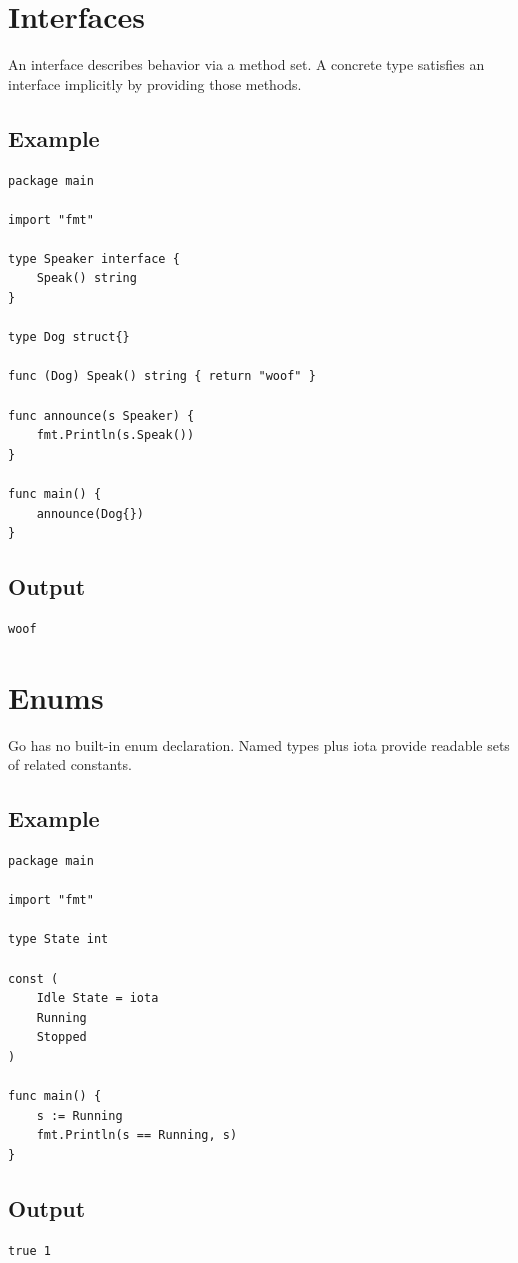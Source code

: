 \documentclass[10pt,oneside]{article}
\newcommand{\sectionline}{\par\vspace{4pt}{\color{rule}\hrule height .5pt}\vspace{7pt}\color{ink}\noindent}
\begin{document}
\section{Interfaces}
\sectionline
An interface describes behavior via a method set. A concrete type satisfies an interface implicitly by providing those methods.\par
\subsection*{Example}
\begin{lstlisting}[style=gocode]
package main

import "fmt"

type Speaker interface {
	Speak() string
}

type Dog struct{}

func (Dog) Speak() string { return "woof" }

func announce(s Speaker) {
	fmt.Println(s.Speak())
}

func main() {
	announce(Dog{})
}
\end{lstlisting}
\subsection*{Output}
\begin{lstlisting}[style=terminal]
woof
\end{lstlisting}
\clearpage
\section{Enums}
\sectionline
Go has no built-in enum declaration. Named types plus iota provide readable sets of related constants.\par
\subsection*{Example}
\begin{lstlisting}[style=gocode]
package main

import "fmt"

type State int

const (
	Idle State = iota
	Running
	Stopped
)

func main() {
	s := Running
	fmt.Println(s == Running, s)
}
\end{lstlisting}
\subsection*{Output}
\begin{lstlisting}[style=terminal]
true 1
\end{lstlisting}
\clearpage
\end{document}
